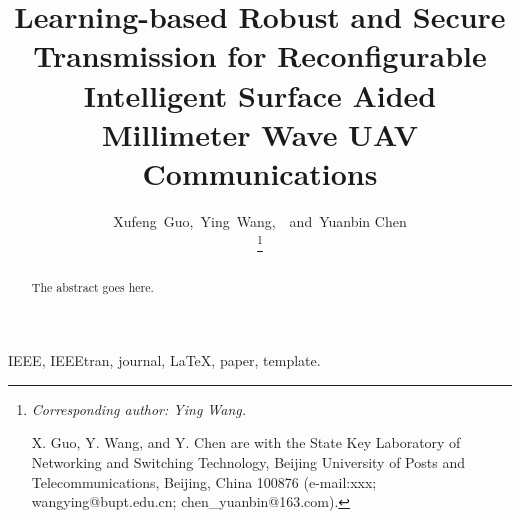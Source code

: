 \documentclass[journal]{IEEEtran}
\begin{document}
%
\title{Learning-based Robust and Secure Transmission for Reconfigurable Intelligent Surface Aided Millimeter Wave UAV Communications}
%
%
%

\author{Xufeng~Guo,~Ying~Wang,~~and~Yuanbin Chen%
	
\thanks{	
	\textit{Corresponding author: Ying Wang.}
	
	X. Guo, Y. Wang, and Y. Chen are with the State Key Laboratory of Networking and Switching Technology, Beijing University of Posts and Telecommunications, Beijing, China 100876 (e-mail:xxx; wangying@bupt.edu.cn; chen\_yuanbin@163.com).%
}}


\maketitle

\begin{abstract}
The abstract goes here.
\end{abstract}

\begin{IEEEkeywords}
IEEE, IEEEtran, journal, \LaTeX, paper, template.
\end{IEEEkeywords}






%
\IEEEpeerreviewmaketitle
\end{document}
